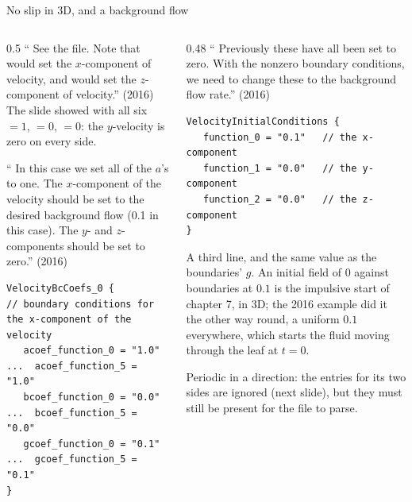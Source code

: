 \documentclass[aspectratio=169,11pt]{beamer}
\begin{document}
\begin{frame}[fragile]{No slip in 3D, and a background flow}
\label{fr:noslip}
\begin{columns}[T,onlytextwidth]
\begin{column}{0.5\textwidth}
\small `` See the  file. Note that  would set the $x$-component of velocity, and  would set the $z$-component of velocity.'' (2016) The slide showed  with all six  $= 1$,  $= 0$,  $= 0$: the $y$-velocity is zero on every side.
\vspace{1mm}

\small `` In this case we set all of the $a$'s to one. The $x$-component of the velocity should be set to the desired background flow (0.1 in this case). The $y$- and $z$-components should be set to zero.'' (2016)
\begin{lstlisting}[style=inputtiny]
VelocityBcCoefs_0 {                       // boundary conditions for the x-component of the velocity
   acoef_function_0 = "1.0"  ...  acoef_function_5 = "1.0"
   bcoef_function_0 = "0.0"  ...  bcoef_function_5 = "0.0"
   gcoef_function_0 = "0.1"  ...  gcoef_function_5 = "0.1"
}
\end{lstlisting}
\end{column}
\begin{column}{0.48\textwidth}
\small `` Previously these have all been set to zero. With the nonzero boundary conditions, we need to change these to the background flow rate.'' (2016)
\begin{lstlisting}[style=inputtiny]
VelocityInitialConditions {
   function_0 = "0.1"   // the x-component
   function_1 = "0.0"   // the y-component
   function_2 = "0.0"   // the z-component
}
\end{lstlisting}
\footnotesize A third  line, and the same value as the boundaries' $g$. An initial field of $0$ against boundaries at $0.1$ is the impulsive start of chapter 7, in 3D; the 2016 example did it the other way round, a uniform $0.1$ everywhere, which starts the fluid moving through the leaf at $t = 0$.
\vspace{1mm}

\footnotesize Periodic in a direction: the  entries for its two sides are ignored (next slide), but they must still be present for the file to parse.
\end{column}
\end{columns}
\end{frame}
\end{document}
